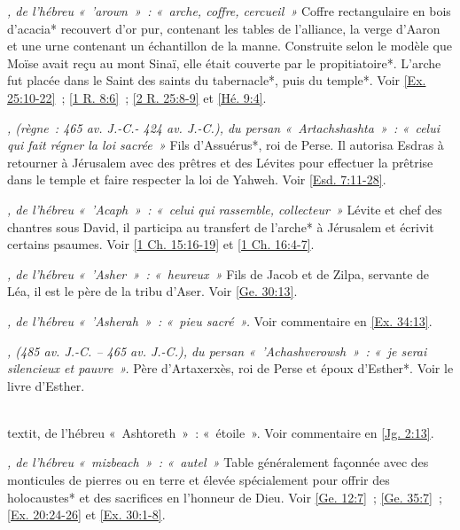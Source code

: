 \begin{multicols}{2}
\textit{, de l'hébreu «~'arown~»~: «~arche, coffre, cercueil~»}\newline
Coffre rectangulaire en bois d'acacia* recouvert d'or pur, contenant les tables de l'alliance, la verge d'Aaron et une urne contenant un échantillon de la manne. Construite selon le modèle que Moïse avait reçu au mont Sinaï, elle était couverte par le propitiatoire*. L'arche fut placée dans le Saint des saints du tabernacle*, puis du temple*. Voir \vref{Ex. 25:10-22}~; \vref{1 R. 8:6}~; \vref{2 R. 25:8-9} et \vref{Hé. 9:4}.

\textit{, (règne~: 465 av. J.-C.- 424 av. J.-C.), du persan «~Artachshashta~»~: «~celui qui fait régner la loi sacrée~»}\newline
Fils d'Assuérus*, roi de Perse. Il autorisa Esdras à retourner à Jérusalem avec des prêtres et des Lévites pour effectuer la prêtrise dans le temple et faire respecter la loi de Yahweh. Voir \vref{Esd. 7:11-28}.

\textit{, de l'hébreu «~'Acaph~»~: «~celui qui rassemble, collecteur~»}\newline
Lévite et chef des chantres sous David, il participa au transfert de l'arche* à Jérusalem et écrivit certains psaumes. Voir \vref{1 Ch. 15:16-19} et \vref{1 Ch. 16:4-7}.

\textit{, de l'hébreu «~'Asher~»~: «~heureux~»}\newline
Fils de Jacob et de Zilpa, servante de Léa, il est le père de la tribu d'Aser. Voir \vref{Ge. 30:13}.

\textit{, de l'hébreu «~'Asherah~»~: «~pieu sacré~».}\newline
Voir commentaire en \vref{Ex. 34:13}.

\textit{, (485 av. J.-C. – 465 av. J.-C.), du persan «~'Achashverowsh~»~: «~je serai silencieux et pauvre~».}\newline
Père d'Artaxerxès, roi de Perse et époux d'Esther*. Voir le livre d'Esther.

\\textit{, de l'hébreu «~Ashtoreth~»~: «~étoile~».}\newline
Voir commentaire en \vref{Jg. 2:13}.

\textit{, de l'hébreu «~mizbeach~»~: «~autel~»}\newline
Table généralement façonnée avec des monticules de pierres ou en terre et élevée spécialement pour offrir des holocaustes* et des sacrifices en l'honneur de Dieu.\newline
Voir \vref{Ge. 12:7}~; \vref{Ge. 35:7}~; \vref{Ex. 20:24-26} et \vref{Ex. 30:1-8}.


\end{multicols}
